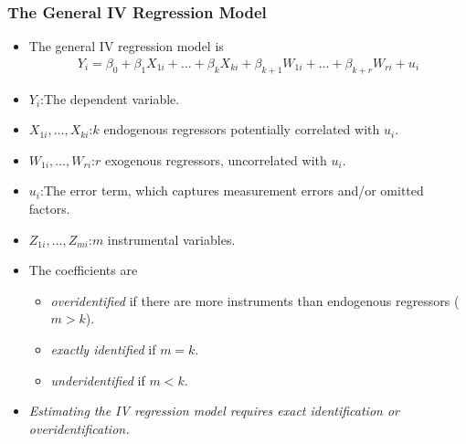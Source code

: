 

\begin{frame}
\frametitle{The General IV Regression Model}
\begin{itemize}
\item The general IV regression model is
\begin{align*}
Y_{i} = \beta_{0} + \beta_{1} X_{1i} + \ldots + \beta_{k} X_{ki} + \beta_{k+1} W_{1i} + \ldots + \beta_{k+r} W_{ri} + u_{i}
\end{align*}
\item $Y_{i}$:\quad The dependent variable.
\item $X_{1i},\ldots,X_{ki}$:\quad $k$ endogenous regressors potentially correlated with $u_{i}$.
\item $W_{1i},\ldots,W_{ri}$:\quad $r$ exogenous regressors, uncorrelated with $u_{i}$.
\item $u_{i}$:\quad The error term, which captures measurement errors and/or omitted factors. 
\item $Z_{1i},\ldots,Z_{mi}$:\quad $m$ instrumental variables.
\item The coefficients are 
\begin{itemize}
\item \emph{overidentified} if there are more instruments than endogenous regressors ($m>k$).
\item \emph{exactly identified} if $m=k$. 
\item \emph{underidentified} if $m<k$.
\end{itemize}
\item \emph{Estimating the IV regression model requires exact identification or overidentification.}
\end{itemize}
\end{frame}


